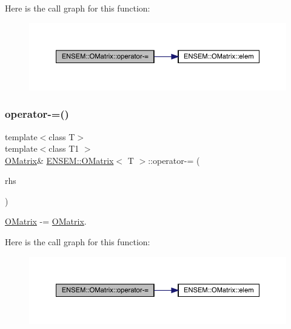Here is the call graph for this function\+:
\nopagebreak
\begin{figure}[H]
\begin{center}
\leavevmode
\includegraphics[width=350pt]{dd/d80/classENSEM_1_1OMatrix_a4c9bcdd861f4439d1b165ec5285cf55f_cgraph}
\end{center}
\end{figure}
\mbox{\label{classENSEM_1_1OMatrix_a4c9bcdd861f4439d1b165ec5285cf55f}} 
\subsubsection{\texorpdfstring{operator-\/=()}{operator-=()}\hspace{0.1cm}{\footnotesize\ttfamily [2/4]}}
{\footnotesize\ttfamily template$<$class T$>$ \\
template$<$class T1 $>$ \\
\mbox{\hyperlink{classENSEM_1_1OMatrix}{O\+Matrix}}\& \mbox{\hyperlink{classENSEM_1_1OMatrix}{E\+N\+S\+E\+M\+::\+O\+Matrix}}$<$ T $>$\+::operator-\/= (\begin{DoxyParamCaption}\item[{const \mbox{\hyperlink{classENSEM_1_1OMatrix}{O\+Matrix}}$<$ T1 $>$ \&}]{rhs }\end{DoxyParamCaption})\hspace{0.3cm}{\ttfamily [inline]}}



\mbox{\hyperlink{classENSEM_1_1OMatrix}{O\+Matrix}} -\/= \mbox{\hyperlink{classENSEM_1_1OMatrix}{O\+Matrix}}. 

Here is the call graph for this function\+:
\nopagebreak
\begin{figure}[H]
\begin{center}
\leavevmode
\includegraphics[width=350pt]{dd/d80/classENSEM_1_1OMatrix_a4c9bcdd861f4439d1b165ec5285cf55f_cgraph}
\end{center}
\end{figure}
\mbox{\label{classENSEM_1_1OMatrix_a53a1a690a2f39f0c64c6d261efc00e4c}} 

